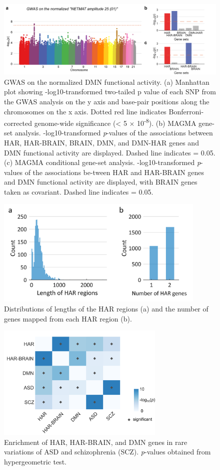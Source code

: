 \begin{refsection}
\begin{figure}[H]
    \centering
    \includegraphics[width=\linewidth]{images/harFigS7.png}
    \caption{GWAS on the normalized DMN functional activity. (a) Manhattan plot showing -log10-transformed two-tailed p value of each SNP from the GWAS analysis on the y axis and base-pair positions along the chromosomes on the x axis. Dotted red line indicates Bonferroni-corrected genome-wide significance (\pval < 5 × 10\textsuperscript{-8}). (b) MAGMA gene-set analysis. -log10-transformed \textit{p}-values of the associations between HAR, HAR-BRAIN, BRAIN, DMN, and DMN-HAR genes and DMN functional activity are displayed. Dashed line indicates \pval = 0.05. (c) MAGMA conditional gene-set analysis. -log10-transformed \textit{p}-values of the associations be-tween HAR and HAR-BRAIN genes and DMN functional activity are displayed, with BRAIN genes taken as covariant. Dashed line indicates \pval = 0.05.}
    \label{harFigs7}
\end{figure}

\begin{figure}[H]
    \centering
    \includegraphics[width=10cm]{images/harFigS8.png}
    \caption{Distributions of lengths of the HAR regions (a) and the number of genes mapped from each HAR region (b).}
    \label{harFigs8}
\end{figure}

\begin{figure}[H]
    \centering
    \includegraphics[width=8cm]{images/harFigS9.png}
    \caption{Enrichment of HAR, HAR-BRAIN, and DMN genes in rare variations of ASD and schizophrenia (SCZ). \textit{p}-values obtained from hypergeometric test.}
    \label{harFigs9}
\end{figure}


\end{refsection}
